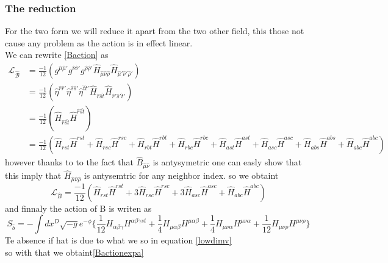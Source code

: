 \documentclass{article}
\begin{document}
\subsubsection{The reduction}
For the two form we will reduce it apart from the two other field, this those not cause any problem as the action is in effect linear.\\
We can rewrite \eqref{Baction} as
\begin{align*}
    \mathcal{L_{\hat B}} &= \frac{-1}{12}(g^{ \hat \mu  \hat \mu'} g^{\hat \nu \hat \nu'} g^{\hat \rho  \hat \rho'} \hat H_{ \hat \mu \hat \nu \hat \rho} \hat H_{ \hat \mu' \hat \nu' \hat \rho'})\\
    &=\frac{-1}{12} (\hat \eta^{ \hat r \hat r'} \hat \eta^{\hat s \hat s'} \hat \eta^{\hat t \hat t'} \hat H_{ \hat r \hat s \hat t} \hat H_{ \hat r'  \hat s' \hat t'})\\
    &=\frac{-1}{12}(\hat H_{ \hat r \hat s\hat t}\hat H^{ \hat r \hat s \hat t})\\
    &=\frac{-1}{12}(\hat H_{  r  s t}\hat H^{  r  s  t} + \hat H_{  r  s c}\hat H^{  r  s  c} + \hat H_{  r  b t}\hat H^{  r  b  t} + \hat H_{  r  b c}\hat H^{  r  b  c} + \hat H_{  a  s t}\hat H^{  a  s  t} + \hat H_{  a  s c}\hat H^{  a  s  c} + \hat H_{  a  b s}\hat H^{  a  b  s} + \hat H_{  a  b c}\hat H^{  a  b  c})
\end{align*}
however thanks to to the fact that $\hat B_{\hat \mu \hat \nu}$ is antysymetric one can easly show that this imply that $\hat H_{ \hat \mu \hat \nu \hat \rho}$ is antysemtric for any neighbor index. so we obtaint
\begin{equation}
    \mathcal{L}_{\hat B} =\frac{-1}{12} (\hat H_{  r  s t}\hat H^{  r  s  t} + 3\hat H_{  r  s c}\hat H^{  r  s  c} + 3\hat H_{  a  s c}\hat H^{  a  s  c} + \hat H_{  a  b c}\hat H^{  a  b  c})
\end{equation}
and finnaly the action of B is writen as
\begin{equation} \label{Bactionexpa}
    \boxed{S_{\hat b } = - \int dx^D\sqrt{-g}e^{-\phi} \Big\lbrace  \frac{1}{12} H_{  \alpha  \beta \gamma} H^{  \alpha \beta \gamma  s  t} + \frac{1}{4} H_{  \mu   \alpha \beta} H^{  \mu   \alpha  \beta} + \frac{1}{4} H_{  \mu \nu \alpha } H^{  \mu  \nu  \alpha} + \frac{1}{12} H_{  \mu  \nu \rho}H^{  \mu  \nu  \rho} \Big\rbrace }
\end{equation}
Te absence if hat is due to what we so in equation \eqref{lowdimv} \\
so with that we obtaint\eqref{Bactionexpa}\\
\end{document}
